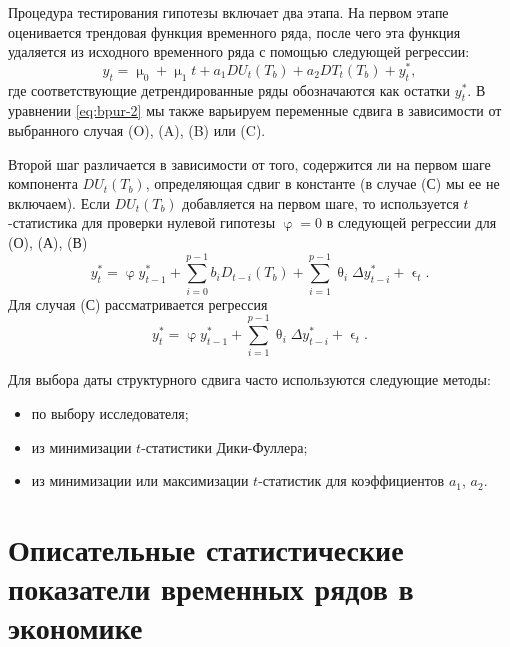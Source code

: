 \documentclass[a4paper, 14pt]{extreport}
\numberwithin{equation}{section}
\renewcommand{\epsilon}{\upvarepsilon}
\renewcommand{\theta}{\uptheta}
\renewcommand{\mu}{\upmu}
\renewcommand{\varphi}{\upvarphi}
\numberwithin{equation}{section}
\begin{document}
	Процедура тестирования гипотезы включает два этапа. На первом этапе оценивается трендовая функция временного ряда, после чего эта функция удаляется из исходного временного ряда с помощью следующей регрессии:
	\begin{equation}\label{eq:bpur-2}
		y_t=\mu_0+\mu_1 t+a_1DU_t(T_b)+a_2DT_t(T_b)+y^*_t,
	\end{equation}
	где соответствующие детрендированные ряды обозначаются как остатки $y^*_t$. В уравнении \eqref{eq:bpur-2} мы также варьируем переменные сдвига в зависимости от выбранного случая (O), (A), (B) или (C).
	
	Второй шаг различается в зависимости от того, содержится ли на первом шаге компонента $DU_t(T_b)$, определяющая сдвиг в константе (в случае (С) мы ее не включаем). Если $DU_t(T_b)$ добавляется на первом шаге, то используется $t$-статистика для проверки нулевой гипотезы $\varphi=0$ в следующей регрессии для (О), (А), (В)
	\begin{equation}
		y^*_t=\varphi y^*_{t-1}+\sum\limits_{i=0}^{p-1}b_iD_{t-i}(T_b)+\sum\limits_{i=1}^{p-1}\theta_i\Delta y^*_{t-i}+\epsilon_t.
	\end{equation}
	Для случая (С) рассматривается регрессия
	\begin{equation}
		y^*_t=\varphi y^*_{t-1}+\sum\limits_{i=1}^{p-1}\theta_i\Delta y^*_{t-i}+\epsilon_t.
	\end{equation}
	
	Для выбора даты структурного сдвига часто используются следующие методы:
	\begin{itemize}
		\item по выбору исследователя;
		\item из минимизации $t$-статистики Дики-Фуллера;
		\item из минимизации или максимизации $t$-статистик для коэффициентов $a_1$, $a_2$.
	\end{itemize}
	
	\section{Описательные статистические показатели временных рядов в экономике}\label{sec:9}
	
\end{document}
